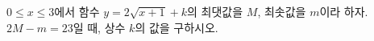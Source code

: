 \hspace*{2mm}\begin{minipage}[t]{\dimexpr\linewidth-2mm\relax}\vspace{0pt}
$0\le x\le 3$에서 함수 $y=2\sqrt{x+1}+k$의 최댓값을 $M$, 최솟값을 $m$이라 하자. $2M-m=23$일 때, 상수 $k$의 값을 구하시오.\end{minipage}
